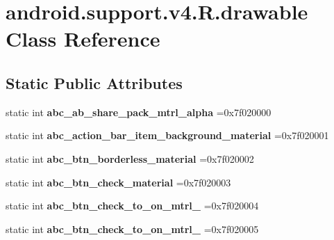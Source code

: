 \hypertarget{classandroid_1_1support_1_1v4_1_1R_1_1drawable}{}\section{android.\+support.\+v4.\+R.\+drawable Class Reference}
\label{classandroid_1_1support_1_1v4_1_1R_1_1drawable}
\subsection*{Static Public Attributes}
\begin{DoxyCompactItemize}
\item 
\mbox{\label{classandroid_1_1support_1_1v4_1_1R_1_1drawable_a1e8a18e1b51b3d5ce1e212ed1b71b095}} 
static int {\bfseries abc\+\_\+ab\+\_\+share\+\_\+pack\+\_\+mtrl\+\_\+alpha} =0x7f020000
\item 
\mbox{\label{classandroid_1_1support_1_1v4_1_1R_1_1drawable_acb428099d31ee689cba80a12ca9338e1}} 
static int {\bfseries abc\+\_\+action\+\_\+bar\+\_\+item\+\_\+background\+\_\+material} =0x7f020001
\item 
\mbox{\label{classandroid_1_1support_1_1v4_1_1R_1_1drawable_aae86447aa08640aa76ba3cd6b3912710}} 
static int {\bfseries abc\+\_\+btn\+\_\+borderless\+\_\+material} =0x7f020002
\item 
\mbox{\label{classandroid_1_1support_1_1v4_1_1R_1_1drawable_ab69b96fa8af823e66b2a13ca56399790}} 
static int {\bfseries abc\+\_\+btn\+\_\+check\+\_\+material} =0x7f020003
\item 
\mbox{\label{classandroid_1_1support_1_1v4_1_1R_1_1drawable_aded3a4aa79e9dd78f94cf6fe0fc60b38}} 
static int {\bfseries abc\+\_\+btn\+\_\+check\+\_\+to\+\_\+on\+\_\+mtrl\+\_} =0x7f020004
\item 
\mbox{\label{classandroid_1_1support_1_1v4_1_1R_1_1drawable_ae5ac6794e95843cc9995498c4a5ba9c3}} 
static int {\bfseries abc\+\_\+btn\+\_\+check\+\_\+to\+\_\+on\+\_\+mtrl\+\_} =0x7f020005

\end{DoxyCompactItemize}
